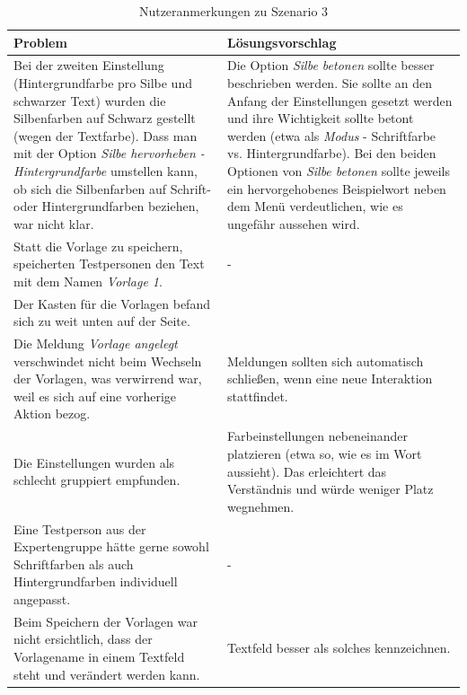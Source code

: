 \begin{table}
	\centering
	\begin{tabular}{|p{}|p{}|}
		\hline
		\textbf{Problem} & \textbf{Lösungsvorschlag}\\
		\hline
		\hline
		Bei der zweiten Einstellung (Hintergrundfarbe pro Silbe und schwarzer Text) wurden die Silbenfarben auf Schwarz gestellt (wegen der Textfarbe). Dass man mit der Option \textit{Silbe hervorheben - Hintergrundfarbe} umstellen kann, ob sich die Silbenfarben auf Schrift- oder Hintergrundfarben beziehen, war nicht klar. & Die Option \textit{Silbe betonen} sollte besser beschrieben werden. Sie sollte an den Anfang der Einstellungen gesetzt werden und ihre Wichtigkeit sollte betont werden (etwa als \textit{Modus} - Schriftfarbe vs. Hintergrundfarbe). Bei den beiden Optionen von \textit{Silbe betonen} sollte jeweils ein hervorgehobenes Beispielwort neben dem Menü verdeutlichen, wie es ungefähr aussehen wird.\\
		\hline
		Statt die Vorlage zu speichern, speicherten Testpersonen den Text mit dem Namen \textit{Vorlage 1}. & -\\
		\hline
		Der Kasten für die Vorlagen befand sich zu weit unten auf der Seite. & \\
		\hline
		Die Meldung \textit{Vorlage angelegt} verschwindet nicht beim Wechseln der Vorlagen, was verwirrend war, weil es sich auf eine vorherige Aktion bezog. & Meldungen sollten sich automatisch schließen, wenn eine neue Interaktion stattfindet.\\
		\hline
		Die Einstellungen wurden als schlecht gruppiert empfunden.  & Farbeinstellungen nebeneinander platzieren (etwa so, wie es im Wort aussieht). Das erleichtert das Verständnis und würde weniger Platz wegnehmen.\\
		\hline
		Eine Testperson aus der Expertengruppe hätte gerne sowohl Schriftfarben als auch Hintergrundfarben individuell angepasst. & -\\
		\hline
		Beim Speichern der Vorlagen war nicht ersichtlich, dass der Vorlagename in einem Textfeld steht und verändert werden kann. & Textfeld besser als solches kennzeichnen.\\
		\hline
	\end{tabular}
	\caption{Nutzeranmerkungen zu Szenario 3}
	\label{table:szenario3}
\end{table}


